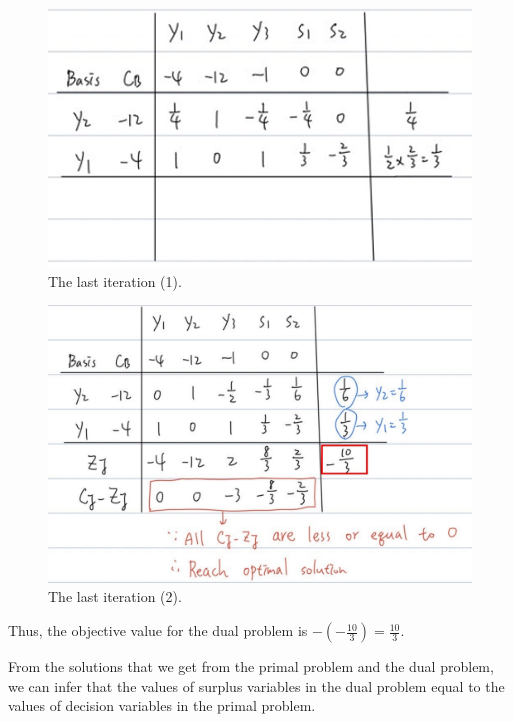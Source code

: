 \documentclass[a4paper,10pt]{article}
\begin{document}
\begin{enumerate}
\begin{enumerate}
{\begin{enumerate}
                \begin{figure}[H]
                    \centering
                    \includegraphics[scale=0.6]{./dual4.png}
                    \caption{The last iteration (1).}
                \end{figure}
                
                \begin{figure}[H]
                    \centering
                    \includegraphics[scale=0.3]{./dual5.png}
                    \caption{The last iteration (2).}
                \end{figure}

                Thus, the objective value for the dual problem is $-(-\frac{10}{3}) = \frac{10}{3}$.
            \end{enumerate}

            From the solutions that we get from the primal problem and the dual problem,
            we can infer that the values of surplus variables in the dual problem equal to the values of decision variables in the primal problem.
            
}
\end{enumerate}
\end{enumerate}
\end{document}
